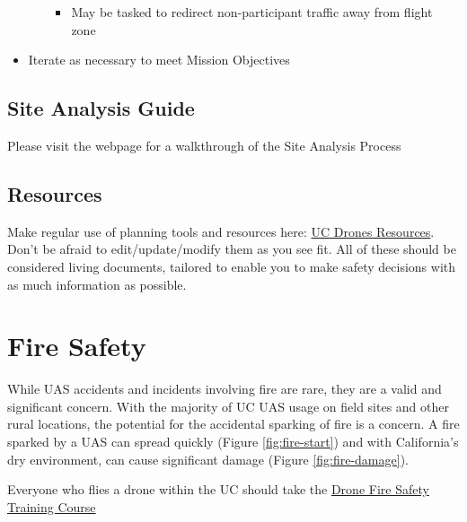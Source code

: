 \documentclass[
  12pt,
]{book}
\providecommand{\tightlist}{%
  \setlength{\itemsep}{0pt}\setlength{\parskip}{0pt}}
\begin{document}
\begin{itemize}
\begin{itemize}
    \begin{itemize}
    \tightlist
    \item
      May be tasked to redirect non-participant traffic away from flight zone
    \end{itemize}
  \end{itemize}
\item
  Iterate as necessary to meet Mission Objectives
\end{itemize}

\subsection{Site Analysis Guide}\label{site-analysis-guide}

Please visit the webpage for a walkthrough of the Site Analysis Process

\subsection{Resources}\label{resources}

Make regular use of planning tools and resources here: \href{https://ucdrones.github.io/ch-resources.html}{UC Drones Resources}. Don't be afraid to edit/update/modify them as you see fit. All of these should be considered living documents, tailored to enable you to make safety decisions with as much information as possible.

\section{Fire Safety}\label{fire-safety}

While UAS accidents and incidents involving fire are rare, they are a valid and significant concern. With the majority of UC UAS usage on field sites and other rural locations, the potential for the accidental sparking of fire is a concern. A fire sparked by a UAS can spread quickly (Figure \ref{fig:fire-start}) and with California's dry environment, can cause significant damage (Figure \ref{fig:fire-damage}).

Everyone who flies a drone within the UC should take the \href{https://ucdrones.github.io/library/trainings/FireSafety/index.html}{Drone Fire Safety Training Course}
\end{document}
